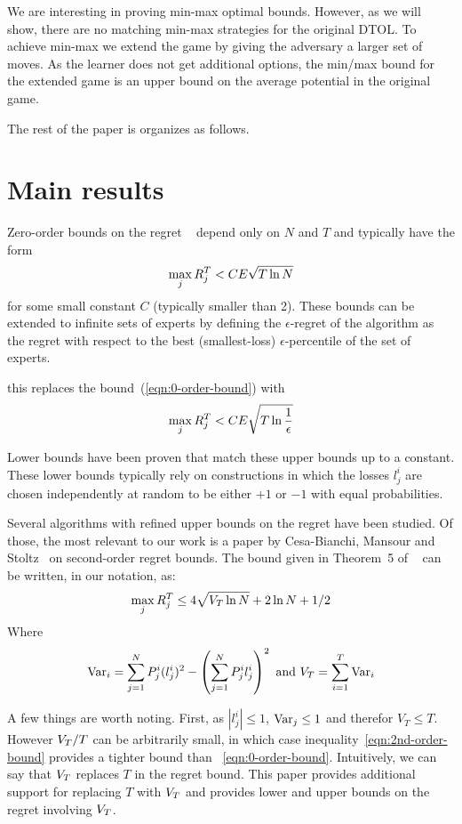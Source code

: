 \documentclass{article}[12pt]
\begin{document}
We are interesting in proving min-max optimal bounds. However, as we
will show, there are no matching min-max strategies for the original
DTOL. To achieve min-max we extend the game by giving the adversary a
larger set of moves. As the learner does not get additional options,
the min/max bound for the extended game is an upper bound on the
average potential in the original game.

The rest of the paper is organizes as follows.

\section{Main results}
Zero-order bounds on the regret ~\cite{freund1999adaptive} depend only on $N$
and $T$ and typically have the form
\begin{equation} \label{eqn:0-order-bound}
  \max_j R_j^T < C E \sqrt{T \ln N}
\end{equation}
for some small constant $C$ (typically smaller than 2).
These bounds can be extended to infinite sets of experts by defining
the $\epsilon$-regret of the algorithm as the regret with respect to
the best (smallest-loss) $\epsilon$-percentile of the set of experts.

this replaces the bound~(\ref{eqn:0-order-bound}) with 
\begin{equation} \label{eqn:0-epsilon-order-bound}
  \max_j R_j^T < C E \sqrt{T \ln \frac{1}{\epsilon}}
\end{equation}

Lower bounds have been proven that match these upper bounds up to a
constant. These lower bounds typically rely on constructions in which
the losses $l_j^i$ are chosen independently at random to be either
$+1$ or $-1$ with equal probabilities.

Several algorithms with refined upper bounds on the regret have been
studied. Of those, the most relevant to our work is a paper by 
Cesa-Bianchi, Mansour and
Stoltz~\cite{cesa2007improved} on second-order regret bounds.
The bound given in Theorem~5 of ~\cite{cesa2007improved} can be
written, in our notation, as:
\begin{equation} \label{eqn:2nd-order-bound}
  \max_j R_j^T \leq 4\sqrt{V_T \ln N} +2 \ln N +1/2 
\end{equation}
Where
\[
  \mbox{Var}_i = \sum_{j=1}^N P^i_j (l_j^i)^2 -  \left( \sum_{j=1}^N P^i_j
    l_j^i \right)^2 \mbox{ and } V_T= \sum_{i=1}^T \mbox{Var}_i
\]

A few things are worth noting. First, as $|l_j^i|\leq 1$,
$\mbox{Var}_j\leq 1$ and therefor $V_T\leq T$. However $V_T/T$ can be
arbitrarily small, in which case inequality~\ref{eqn:2nd-order-bound}
provides a tighter bound than ~\ref{eqn:0-order-bound}. Intuitively,
we can say that $V_T$ replaces $T$ in the regret bound. This paper
provides additional support for replacing $T$ with $V_T$ and provides
lower and upper bounds on the regret involving $V_T$.
\end{document}
